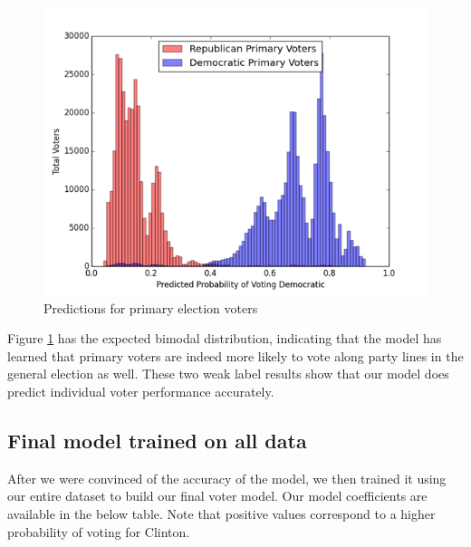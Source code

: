 \documentclass[10pt,twocolumn,letterpaper]{article}
\begin{document}
\begin{figure}[H]
\begin{center}
\includegraphics[scale=0.4]{primaryVoters19}
\end{center}
\caption{Predictions for primary election voters}
\label{fig:primaryVoters19}
\end{figure}

Figure \ref{fig:primaryVoters19} has the expected bimodal distribution, indicating that the model has learned that primary voters are indeed more likely to vote along party lines in the general election as well. These two weak label results show that our model does predict individual voter performance accurately.

\subsection{Final model trained on all data}

After we were convinced of the accuracy of the model, we then trained it using our entire dataset to build our final voter model. Our model coefficients are available in the below table. Note that positive values correspond to a higher probability of voting for Clinton.
\end{document}
